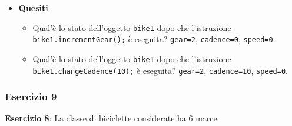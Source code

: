 \documentclass{article}
\theoremstyle{definition}
\begin{document}
\begin{itemize}
\item \textbf{Quesiti}
\begin{itemize}
\item Qual'\`e lo stato dell'oggetto \texttt{bike1} dopo che l'istruzione \texttt{bike1.incrementGear();} \`e eseguita? 
\texttt{gear=2}, \texttt{cadence=0}, \texttt{speed=0}.
\item Qual'\`e lo stato dell'oggetto  \texttt{bike1} dopo che l'istruzione \texttt{bike1.changeCadence(10);} \`e eseguita? 
\texttt{gear=2}, \texttt{cadence=10}, \texttt{speed=0}.
\end{itemize}
\end{itemize}

\subsubsection{Esercizio 9}
\begin{framed}
\textbf{Esercizio 8}: La classe di biciclette considerate ha $6$ marce
\end{framed}
\end{document}
